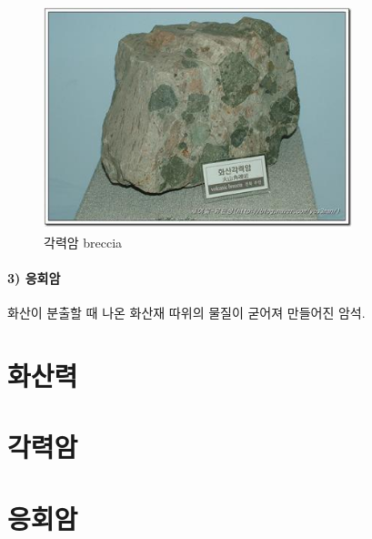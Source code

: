 \documentclass[12pt, a4paper, twoside]{book}
\begin{document}
					\begin{figure}[h]
					\centering
					\caption{각력암 breccia }
					\includegraphics[width=0.8\textwidth]{./fig/breccia_0001.jpg}
					\end{figure}
					
					
			
			\paragraph{3) 응회암} \tab \tab
			
			화산이 분출할 때 나온 화산재 따위의 물질이 굳어져 만들어진 암석.



	\clearpage
	\section{화산력}




	\clearpage
	\section{각력암}
	
	
	
	
	\clearpage
	\section{응회암}
	
\end{document}
